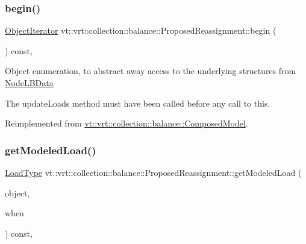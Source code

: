 \subsubsection{\texorpdfstring{begin()}{begin()}}
{\footnotesize\ttfamily \hyperlink{structvt_1_1vrt_1_1collection_1_1balance_1_1_object_iterator}{Object\+Iterator} vt\+::vrt\+::collection\+::balance\+::\+Proposed\+Reassignment\+::begin (\begin{DoxyParamCaption}{ }\end{DoxyParamCaption}) const\hspace{0.3cm}{\ttfamily [override]}, {\ttfamily [virtual]}}

Object enumeration, to abstract away access to the underlying structures from \hyperlink{structvt_1_1vrt_1_1collection_1_1balance_1_1_node_l_b_data}{Node\+L\+B\+Data}

The {\ttfamily update\+Loads} method must have been called before any call to this. 

Reimplemented from \hyperlink{classvt_1_1vrt_1_1collection_1_1balance_1_1_composed_model_a7d32b6f8a0ca5970674238325df11783}{vt\+::vrt\+::collection\+::balance\+::\+Composed\+Model}.

\mbox{\label{structvt_1_1vrt_1_1collection_1_1balance_1_1_proposed_reassignment_abcf28c3b1ffb8b28bed55c28d8d887a4}} 
\subsubsection{\texorpdfstring{get\+Modeled\+Load()}{getModeledLoad()}}
{\footnotesize\ttfamily \hyperlink{namespacevt_a8fb51741340b87d7aaee0bef60e9896b}{Load\+Type} vt\+::vrt\+::collection\+::balance\+::\+Proposed\+Reassignment\+::get\+Modeled\+Load (\begin{DoxyParamCaption}\item[{\hyperlink{namespacevt_1_1vrt_1_1collection_1_1balance_a9f5b53fafb270212279a4757d2c4cd28}{Element\+I\+D\+Struct}}]{object,  }\item[{\hyperlink{structvt_1_1vrt_1_1collection_1_1balance_1_1_phase_offset}{Phase\+Offset}}]{when }\end{DoxyParamCaption}) const\hspace{0.3cm}{\ttfamily [override]}, {\ttfamily [virtual]}}



